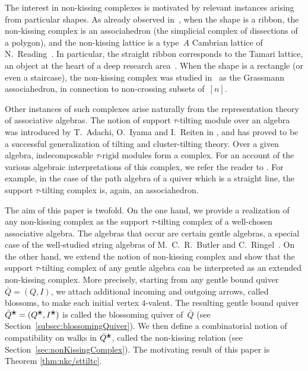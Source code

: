 \documentclass{amsart}
\theoremstyle{definition}
\newcommand{\blossom}{^\text{\ding{96}}} %
\begin{document}
The interest in non-kissing complexes is motivated by relevant instances arising from particular shapes.
As already observed in~\cite[Sect.~10]{McConville}, when the shape is a ribbon, the non-kissing complex is an associahedron (the simplicial complex of dissections of a polygon), and the non-kissing lattice is a type~$A$ Cambrian lattice of N.~Reading~\cite{Reading-CambrianLattices}.
In particular, the straight ribbon corresponds to the Tamari lattice, an object at the heart of a deep research area~\cite{TamariFestschrift}.
When the shape is a rectangle (or even a staircase), the non-kissing complex was studied in~\cite{PetersenPylyavskyySpeyer, SantosStumpWelker} as the Grassmann associahedron, in connection to non-crossing subsets of~$[n]$.

Other instances of such complexes arise naturally from the representation theory of associative algebras.  
The notion of support $\tau$-tilting module over an algebra was introduced by T.~Adachi, O.~Iyama and I.~Reiten in \cite{AdachiIyamaReiten}, and has proved to be a successful generalization of tilting and cluster-tilting theory.  
Over a given algebra, indecomposable $\tau$-rigid modules form a complex. 
For an account of the various algebraic interpretations of this complex, we refer the reader to \cite{BrustleYang}.  
For example, in the case of the path algebra of a quiver which is a straight line, the support $\tau$-tilting complex is, again, an associahedron.

The aim of this paper is twofold.
On the one hand, we provide a realization of any non-kissing complex as the support $\tau$-tilting complex of a well-chosen associative algebra.
The algebras that occur are certain gentle algebras, a special case of the well-studied string algebras of M.~C.~R.~Butler and C.~Ringel~\cite{ButlerRingel}.
On the other hand, we extend the notion of non-kissing complex and show that the support $\tau$-tilting complex of any gentle algebra can be interpreted as an extended non-kissing complex.
More precisely, starting from any gentle bound quiver~$\bar Q = (Q,I)$, we attach additional incoming and outgoing arrows, called blossoms, to make each initial vertex \mbox{$4$-valent}. The resulting gentle bound quiver~$\bar Q\blossom = (Q\blossom, I\blossom)$ is called the blossoming quiver of~$\bar Q$ (see Section~\ref{subsec:blossomingQuiver}). 
We then define a combinatorial notion of compatibility on walks in $\bar Q \blossom$, called the non-kissing relation (see Section~\ref{sec:nonKissingComplex}).
The motivating result of this paper is Theorem \ref{thm:nkc/sttiltc}.
\end{document}
